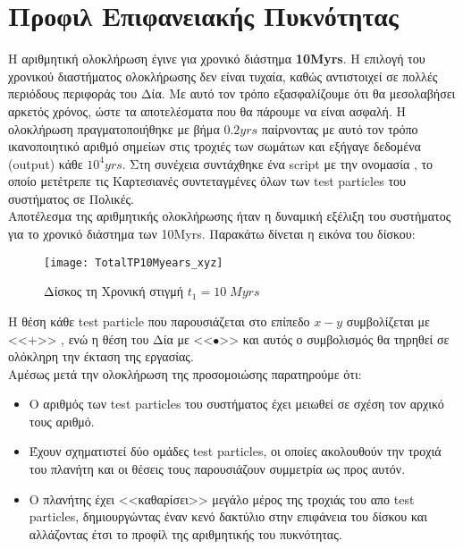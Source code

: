 
 \section{Προφιλ Επιφανειακής Πυκνότητας} 

 Η αριθμητική ολοκλήρωση έγινε για χρονικό διάστημα \textbf{\en 10Myrs}. Η επιλογή του χρονικού διαστήματος ολοκλήρωσης δεν είναι τυχαία, καθώς αντιστοιχεί  σε πολλές περιόδους περιφοράς του Δία. Με αυτό τον τρόπο εξασφαλίζουμε ότι θα μεσολαβήσει αρκετός χρόνος, ώστε τα αποτελέσματα που θα πάρουμε να είναι ασφαλή. Η ολοκλήρωση πραγματοποιήθηκε με βήμα $0.2 yrs$ παίρνοντας με αυτό τον τρόπο ικανοποιητικό αριθμό σημείων στις τροχιές των σωμάτων και εξήγαγε δεδομένα {\en (output)} κάθε $10^4 yrs$. Στη συνέχεια συντάχθηκε ένα {\en script} με την ονομασία {}, το οποίο μετέτρεπε τις Καρτεσιανές συντεταγμένες όλων των {\en test particles} του συστήματος σε Πολικές.\\
Αποτέλεσμα της αριθμητικής ολοκλήρωσης ήταν η δυναμική εξέλιξη του συστήματος για το χρονικό διάστημα των {\en 10Myrs}. Παρακάτω δίνεται η εικόνα του δίσκου:    

\begin{figure}[h]
  \centering
  \texttt{[image: TotalTP10Myears\_xyz]}
  \caption{Δίσκος τη Χρονική στιγμή $t_1=10 \; Myrs$}\label{fig:DiscAfter10Myear}
\end{figure}

Η θέση κάθε {\en test particle} που παρουσιάζεται στο επίπεδο $x-y$ συμβολίζεται με <<+>> , ενώ η θέση του Δία με <<$\bullet$>> και αυτός ο συμβολισμός θα τηρηθεί σε ολόκληρη την έκταση της εργασίας.\\


Αμέσως μετά την ολοκλήρωση της προσομοιώσης παρατηρούμε ότι:

\begin{itemize}
 \item O αριθμός των {\en test particles} του συστήματος έχει μειωθεί σε σχέση τον αρχικό τους αριθμό.
   \item Έχουν σχηματιστεί δύο ομάδες {\en test particles}, οι οποίες ακολουθούν την τροχιά του πλανήτη και οι θέσεις τους παρουσιάζουν συμμετρία ως προς αυτόν.
    \item Ο πλανήτης έχει <<καθαρίσει>> μεγάλο μέρος της τροχιάς του απο {\en test particles}, δημιουργώντας έναν κενό δακτύλιο στην επιφάνεια του δίσκου και αλλάζοντας έτσι το προφίλ της αριθμητικής του πυκνότητας.
\end{itemize}

